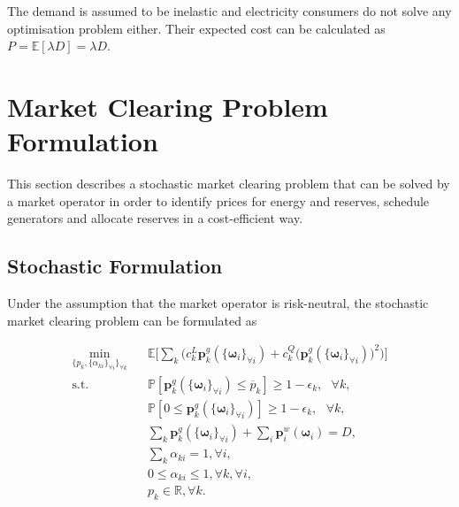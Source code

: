 \documentclass{article}
\begin{document}
The demand is assumed to be inelastic and electricity consumers do not solve any optimisation problem either. Their expected cost can be calculated as $P = \mathbb{E}[\lambda D] = \lambda D$.

\section{Market Clearing Problem Formulation}

This section describes a stochastic market clearing problem that can be solved by a market operator in order to identify prices for energy and reserves, schedule generators and allocate reserves in a cost-efficient way. 

\subsection{Stochastic Formulation}
Under the assumption that the market operator is risk-neutral, the stochastic market clearing problem can be formulated as

\begin{align}
\underset{\{p_k, \{\alpha_{ki}\}_{\forall i}\}_{\forall k}}{\min} \hspace{10pt} & \mathbb{E}\Big[\sum_k \big(c_k^L \mathbf{p}_k^g(\{\boldsymbol{\omega}_i\}_{\forall i}) + c_k^Q \big(\mathbf{p}_k^g(\{\boldsymbol{\omega}_i\}_{\forall i})\big)^2\big)\Big]\\
\mbox{s.t. } & \mathbb{P}[\mathbf{p}_k^g(\{\boldsymbol{\omega}_i\}_{\forall i}) \le \overline{p}_k] \ge 1 - \epsilon_k, \mbox{ }\forall k,\\
& \mathbb{P}[0 \le \mathbf{p}_k^g(\{\boldsymbol{\omega}_i\}_{\forall i})] \ge 1 - \epsilon_k, \mbox{ }\forall k,\\
& \sum_k \mathbf{p}_k^g(\{\boldsymbol{\omega}_i\}_{\forall i}) + \sum_i \mathbf{p}_i^w(\boldsymbol{\omega}_i) = D,\\
& \sum_k \alpha_{ki} = 1, \forall i,\\
& 0 \le \alpha_{ki} \le 1, \forall k, \forall i,\\
& p_k \in \mathbb{R}, \forall k.
\end{align}
\end{document}

